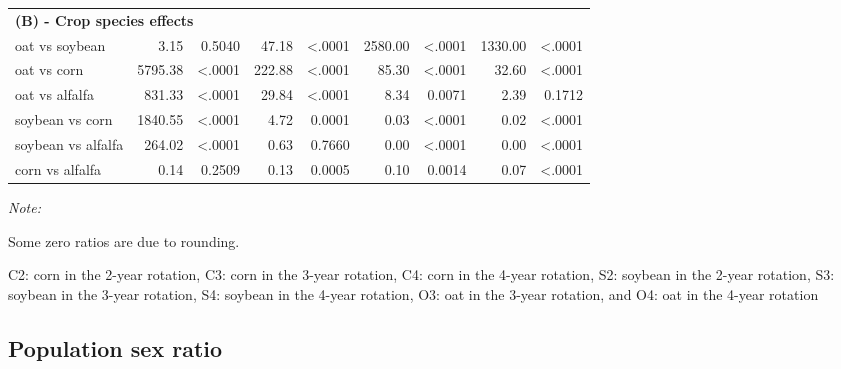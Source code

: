 \documentclass[
]{article}
\begin{document}
\begin{table}[H]
\begin{threeparttable}
\begin{tabular}[t]{lrrr>{}r|rrrr}
\multicolumn{9}{l}{\textbf{(B) - Crop species effects}}\\
\hspace{1em}oat vs soybean & 3.15 & 0.5040 & 47.18 & <.0001 & 2580.00 & <.0001 & 1330.00 & <.0001\\
\hspace{1em}oat vs corn & 5795.38 & <.0001 & 222.88 & <.0001 & 85.30 & <.0001 & 32.60 & <.0001\\
\hspace{1em}oat vs alfalfa & 831.33 & <.0001 & 29.84 & <.0001 & 8.34 & 0.0071 & 2.39 & 0.1712\\
\hspace{1em}soybean vs corn & 1840.55 & <.0001 & 4.72 & 0.0001 & 0.03 & <.0001 & 0.02 & <.0001\\
\hspace{1em}soybean vs alfalfa & 264.02 & <.0001 & 0.63 & 0.7660 & 0.00 & <.0001 & 0.00 & <.0001\\
\hspace{1em}corn vs alfalfa & 0.14 & 0.2509 & 0.13 & 0.0005 & 0.10 & 0.0014 & 0.07 & <.0001\\
\bottomrule
\end{tabular}
\begin{tablenotes}[para]
\item \textit{Note: } 
\item Some zero ratios are due to rounding.
\item C2: corn in the 2-year rotation, C3: corn in the 3-year rotation, C4: corn in the 4-year rotation, S2: soybean in the 2-year rotation, S3: soybean in the 3-year rotation, S4: soybean in the 4-year rotation, O3: oat in the 3-year rotation, and O4: oat in the 4-year rotation
\end{tablenotes}
\end{threeparttable}
\end{table}

\hypertarget{population-sex-ratio-1}{%
\subsection*{Population sex ratio}\label{population-sex-ratio-1}}
\end{document}
